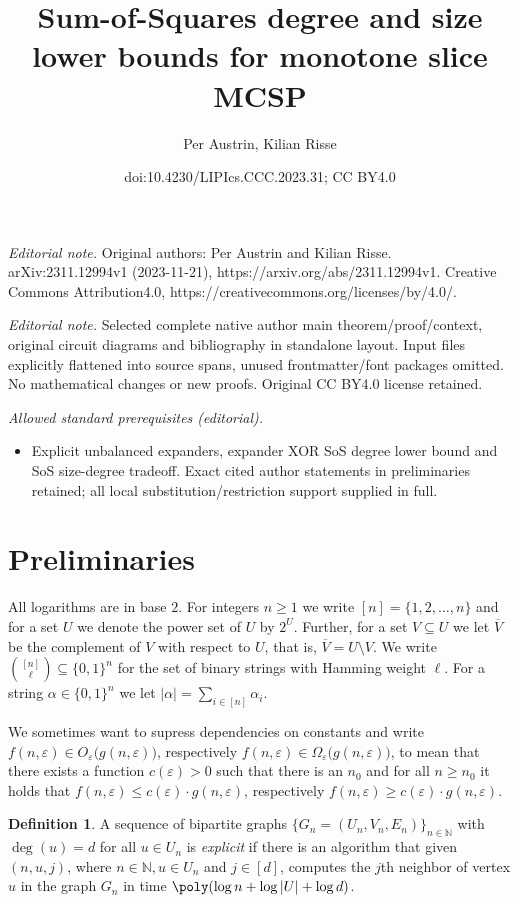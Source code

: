\documentclass[10pt,a4paper]{article}
\title{Sum-of-Squares degree and size lower bounds for monotone slice MCSP}
\author{Per Austrin, Kilian Risse}
\date{doi:10.4230/LIPIcs.CCC.2023.31; CC BY4.0}
\theoremstyle{plain}
\theoremstyle{remark}
\theoremstyle{definition}
\newtheorem{definition}[theorem]{Definition}
\newcommand{\eps}{\varepsilon}
\newcommand{\set}[1]{\{#1\}}
\newcommand{\N}{\mathbb{N}}
\begin{document}
\maketitle
\setcounter{section}{1}
\noindent\textit{Editorial note.} Original authors: Per Austrin and Kilian Risse. arXiv:2311.12994v1 (2023-11-21), https://arxiv.org/abs/2311.12994v1. Creative Commons Attribution4.0, https://creativecommons.org/licenses/by/4.0/.\par\medskip
\noindent\textit{Editorial note.} Selected complete native author main theorem/proof/context, original circuit diagrams and bibliography in standalone layout. Input files explicitly flattened into source spans, unused frontmatter/font packages omitted. No mathematical changes or new proofs. Original CC BY4.0 license retained.\par\medskip
\noindent\textit{Allowed standard prerequisites (editorial).}\begin{itemize}
\item Explicit unbalanced expanders, expander XOR SoS degree lower bound and SoS size-degree tradeoff. Exact cited author statements in preliminaries retained; all local substitution/restriction support supplied in full.
\end{itemize}\medskip
\section{Preliminaries}
\label{sec:preliminaries}

All logarithms are in base $2$.  For integers $n \ge 1$ we write
$[n] = \set{1, 2, \ldots, n}$ and for a set $U$ we denote the power
set of $U$ by $2^{U}$. Further, for a set $V \subseteq U$ we let
$\overline V$ be the complement of $V$ with respect to $U$, that is,
$\overline V = U \setminus V$. We write
$\binom{[n]}{\ell} \subseteq \set{0,1}^n$ for the set of binary
strings with Hamming weight $\ell$. For a string
$\alpha \in \set{0,1}^n$ we let
$|\alpha| = \sum_{i \in [n]} \alpha_i$.

We sometimes want to supress dependencies on constants and write
$f(n, \eps) \in O_\eps\big(g(n, \eps)\big)$, respectively
$f(n, \eps) \in \Omega_\eps\big(g(n, \eps)\big)$, to mean that there
exists a function $c(\eps) > 0$ such that there is an $n_0$ and for all
$n \ge n_0$ it holds that $f(n, \eps) \le c(\eps) \cdot g(n, \eps)$,
respectively $f(n, \eps) \ge c(\eps)\cdot g(n, \eps)$.

\begin{definition}\label{def:explicit}
  A sequence of bipartite graphs $\set{G_n=(U_n, V_n, E_n)}_{n\in \N}$
  with $\deg(u) =d$ for all $u \in U_n$ is \emph{explicit} if there is
  an algorithm that given $(n, u, j)$, where $n \in \N, u \in U_n$ and
  $j\in [d]$, computes the $j$th neighbor of vertex $u$ in the graph
  $G_n$ in time $\poly(\log n + \log |U| + \log d)$.
\end{definition}
\end{document}
